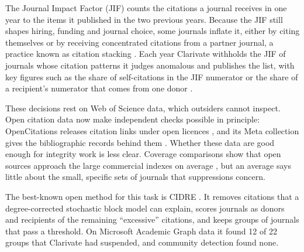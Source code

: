 \documentclass[11pt]{article}
\begin{document}
The Journal Impact Factor (JIF) counts the citations a journal receives in one year to the items it published in the
two previous years. Because the JIF still shapes hiring, funding and journal choice, some journals inflate it, either
by citing themselves or by receiving concentrated citations from a partner journal, a practice known as citation
stacking \cite{heneberg2016stacking,vannoorden2013brazil,wilhite2012coercive,chorus2016coercive}. Each year Clarivate
withholds the JIF of journals whose citation patterns it judges anomalous and publishes the list, with key figures
such as the share of self-citations in the JIF numerator or the share of a recipient's numerator that comes from one
donor \cite{moussa2022suppressed,taskin2021selfcitation}.

These decisions rest on Web of Science data, which outsiders cannot inspect. Open citation data now make independent
checks possible in principle: OpenCitations releases citation links under open licences
\cite{peroni2020opencitations,heibi2019coci}, and its Meta collection gives the bibliographic records behind them
\cite{massari2024meta}. Whether these data are good enough for integrity work is less clear. Coverage comparisons
show that open sources approach the large commercial indexes on average
\cite{martinmartin2021coverage,visser2021comparison,culbert2025openalex}, but an average says little about the small,
specific sets of journals that suppressions concern.

The best-known open method for this task is CIDRE \cite{kojaku2021cidre}. It removes citations that a degree-corrected
stochastic block model can explain, scores journals as donors and recipients of the remaining ``excessive''
citations, and keeps groups of journals that pass a threshold. On Microsoft Academic Graph data it found 12 of 22
groups that Clarivate had suspended, and community detection found none.
\end{document}
